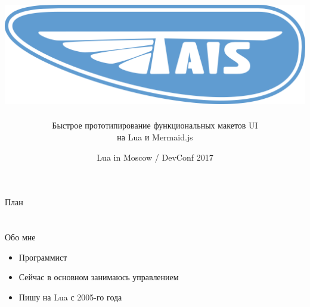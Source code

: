 \documentclass[aspectratio=169,handout,bigger]{beamer}
\title{\includegraphics[height=.15\textheight]{logo}}
\author{Быстрое прототипирование функциональных макетов UI\\на Lua и Mermaid.js}
\institute{Александр Гладыш\\@agladysh}
\date{Lua in Moscow / DevConf 2017}
\begin{document}

\begin{frame}[plain]
 \titlepage
 \vskip 10em
\end{frame}

\usebackgroundtemplate{}


\begin{frame}{План}

\tableofcontents

\end{frame}


\section*{}

\begin{frame}{Обо мне}

\begin{itemize}
\item Программист
\item Сейчас в основном занимаюсь управлением
\item Пишу на Lua с 2005-го года
\end{itemize}

\end{frame}
\end{document}
